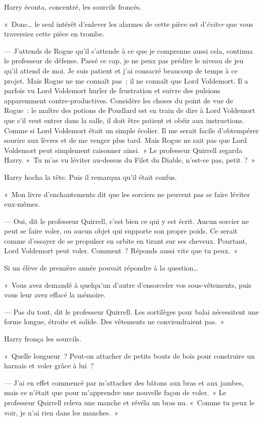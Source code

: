 Harry écouta, concentré, les sourcils froncés.

«~Donc… le seul intérêt d'enlever les alarmes de cette pièce est d'\emph{éviter} que vous traversiez cette pièce en trombe.

--- J'attends de Rogue qu'il s'attende à ce que je comprenne aussi cela, continua le professeur de défense.
Passé ce cap, je ne peux pas prédire le niveau de jeu qu'il attend de moi.
Je suis patient et j'ai consacré beaucoup de temps à ce projet.
Mais Rogue ne me connaît pas~; il ne connaît que Lord Voldemort.
Il a parfois vu Lord Voldemort hurler de frustration et suivre des pulsions apparemment contre-productives.
Considère les choses du point de vue de Rogue~: le maître des potions de Poudlard est en train de dire à Lord Voldemort que s'il veut entrer dans la salle, il doit être patient et obéir aux instructions.
Comme si Lord Voldemort était un simple écolier.
Il me serait facile d'obtempérer sourire aux lèvres et de me venger plus tard.
Mais Rogue ne sait pas que Lord Voldemort peut simplement raisonner ainsi.~»
Le professeur Quirrell regarda Harry.
«~Tu m'as vu léviter au-dessus du Filet du Diable, n'est-ce pas, petit~?~»

Harry hocha la tête.
Puis il remarqua qu'il était confus.

«~Mon livre d'enchantements dit que les sorciers ne peuvent pas se faire léviter eux-mêmes.

--- Oui, dit le professeur Quirrell, c'est bien ce qui y est écrit.
Aucun sorcier ne peut se faire voler, ou aucun objet qui supporte son propre poids.
Ce serait comme d'essayer de se propulser en orbite en tirant sur ses cheveux.
Pourtant, Lord Voldemort peut voler.
Comment~?
Réponds aussi vite que tu peux.~»

Si un élève de première année pouvait répondre à la question…

«~Vous avez demandé à quelqu'un d'autre d'ensorceler vos sous-vêtements, puis vous leur avez effacé la mémoire.

--- Pas du tout, dit le professeur Quirrell.
Les sortilèges pour balai nécessitent une forme longue, étroite et solide.
Des vêtements ne conviendraient pas.~»

Harry fronça les sourcils.

«~Quelle longueur~?
Peut-on attacher de petits bouts de bois pour construire un harnais et voler grâce à lui~?

--- J'ai en effet commencé par m'attacher des bâtons aux bras et aux jambes, mais ce n'était que pour m'apprendre une nouvelle façon de voler.~»
Le professeur Quirrell releva une manche et révéla un bras nu.
«~Comme tu peux le voir, je n'ai rien dans les manches.~»

